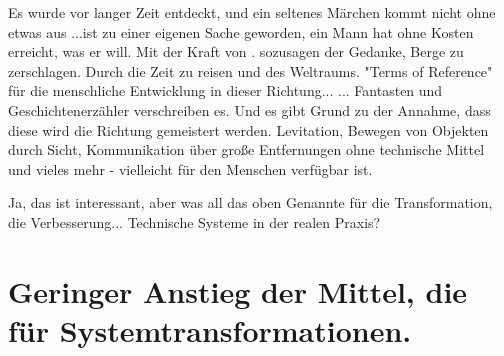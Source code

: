 \documentclass[11pt,a4paper]{article}
\begin{document}
{{Es wurde vor langer Zeit entdeckt, und ein seltenes Märchen kommt nicht ohne etwas aus
...ist zu einer eigenen Sache geworden, ein Mann hat ohne Kosten erreicht, was er will. Mit der Kraft von .
sozusagen der Gedanke, Berge zu zerschlagen. Durch die Zeit zu reisen und
des Weltraums. "Terms of Reference" für die menschliche Entwicklung in dieser Richtung...
... Fantasten und Geschichtenerzähler verschreiben es. Und es gibt Grund zu der Annahme, dass diese
wird die Richtung gemeistert werden. Levitation, Bewegen von Objekten durch Sicht, Kommunikation über
große Entfernungen ohne technische Mittel und vieles mehr - vielleicht
für den Menschen verfügbar ist.


Ja, das ist interessant, aber was all das oben Genannte für die Transformation, die Verbesserung...
Technische Systeme in der realen Praxis?


\section*{Geringer Anstieg der Mittel, die für
Systemtransformationen.}

}}
\end{document}
